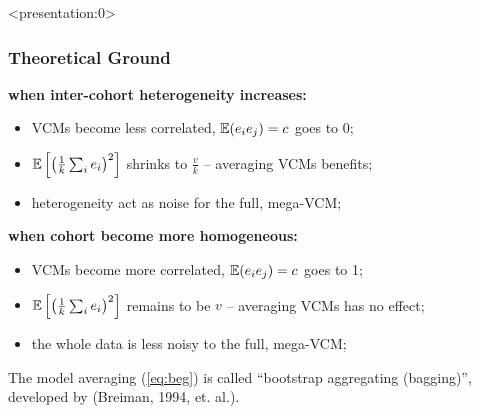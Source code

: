 \documentclass{beamer}
\begin{document}
\begin{frame} <presentation:0>%
  \frametitle{Theoretical Ground}%
  \textbf{when inter-cohort heterogeneity increases:}
  \begin{itemize}
  \item VCMs become less correlated, $\mathbb{E}(e_i e_j) = c$ goes to 0;
  \item $\mathbb{E}\left[ \left(\frac{1}{k}\sum_i e_i\right)^2 \right]$
    shrinks to $\frac{v}{k}$ -- averaging VCMs benefits;
  \item heterogeneity act as noise for the full, mega-VCM;
  \end{itemize}
  \textbf{when cohort become more homogeneous:}
  \begin{itemize}
  \item VCMs become more correlated, $\mathbb{E}(e_i e_j) = c$ goes to 1;
  \item $\mathbb{E}\left[ \left(\frac{1}{k}\sum_i e_i\right)^2 \right]$
    remains to be $v$ -- averaging VCMs has no effect;
  \item the whole data is less noisy to the full, mega-VCM;
  \end{itemize}
  The model averaging (\ref{eq:beg}) is called ``bootstrap aggregating
  (bagging)'', developed by (Breiman, 1994, et. al.).
\end{frame}
\end{document}
